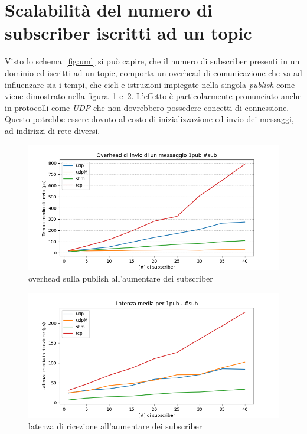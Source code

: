 \section{Scalabilità del numero di subscriber iscritti ad un topic}
Visto lo schema~\ref{fig:uml} si può capire, che il numero di subscriber presenti in un dominio ed iscritti ad un topic, comporta un overhead di comunicazione che va ad influenzare sia i tempi, che cicli e istruzioni impiegate nella singola \emph{publish} come viene dimostrato nella figura~\ref{fig:test3_overhead} e~\ref{fig:test3_latenza}. L'effetto è particolarmente pronunciato anche in protocolli come \emph{UDP} che non dovrebbero possedere concetti di connessione. Questo potrebbe essere dovuto al costo di inizializzazione ed invio dei messaggi, ad indirizzi di rete diversi.
\begin{figure}[H]
    \centering
    \includegraphics[width=\textwidth]{./results/test3_sending_multiplesub.png} %
    \caption{overhead sulla publish all'aumentare dei subscriber}\label{fig:test3_overhead}
\end{figure}
\begin{figure}[H]
    \centering
    \includegraphics[width=\textwidth]{./results/test3_sendingreceiving_multiplesub.png} 
    \caption{latenza di ricezione all'aumentare dei subscriber}\label{fig:test3_latenza}
\end{figure}

